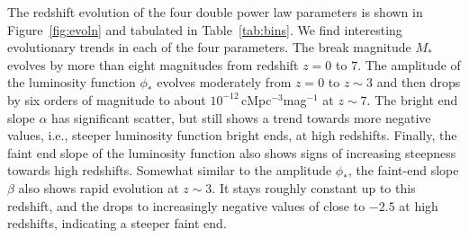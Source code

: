 \documentclass[fleqn,usenatbib]{mnras}
\begin{document}
The redshift evolution of the four double power law parameters is
shown in Figure~\ref{fig:evoln} and tabulated in Table~\ref{tab:bins}.
We find interesting evolutionary trends in each of the four
parameters.  The break magnitude $M_*$ evolves by more than eight
magnitudes from redshift $z=0$ to $7$.  The amplitude of the
luminosity function $\phi_*$ evolves moderately from $z=0$ to $z\sim
3$ and then drops by six orders of magnitude to about
$10^{-12}$\,cMpc$^{-3}$mag$^{-1}$ at $z\sim 7$.  The bright end slope
$\alpha$ has significant scatter,
but still shows a trend towards more
negative values, i.e., steeper luminosity function bright ends, at
high redshifts.  Finally, the faint end slope of the luminosity
function also shows signs of increasing steepness towards high
redshifts.
Somewhat similar to the amplitude $\phi_*$, the faint-end slope
$\beta$ also shows rapid evolution at $z\sim 3$.  It stays roughly
constant up to this redshift, and the drops to increasingly negative
values of close to $-2.5$ at high redshifts, indicating a steeper
faint end.




\end{document}

